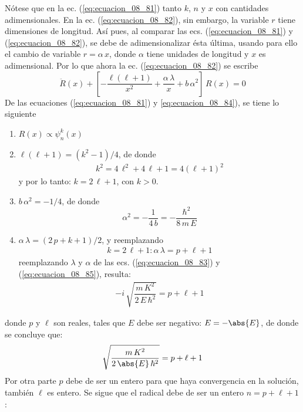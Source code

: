 Nótese que en la ec. (\ref{eq:ecuacion_08_81}) tanto $k$, $n$ y $x$ con cantidades adimensionales. En la ec. (\ref{eq:ecuacion_08_82}), sin embargo, la variable $r$ tiene dimensiones de longitud. Así pues, al comparar las ecs. (\ref{eq:ecuacion_08_81}) y (\ref{eq:ecuacion_08_82}), se debe de adimensionalizar ésta última, usando para ello el cambio de variable $r = \alpha \, x$, donde $\alpha$ tiene unidades de longitud y $x$ es adimensional. Por lo que ahora la ec. (\ref{eq:ecuacion_08_82}) se escribe
\begin{equation}
\ddot{R} (x) + \left[ - \dfrac{\ell (\ell + 1)}{x^{2}} + \dfrac{\alpha \, \lambda}{x} + b \, \alpha^{2} \right] \, R (x) = 0
\label{eq:ecuacion_08_84}
\end{equation}
De las ecuaciones (\ref{eq:ecuacion_08_81}) y \ref{eq:ecuacion_08_84}), se tiene lo siguiente
\begin{enumerate}[label=\roman*.)]
\item $R(x) \propto \psi_{n}^{k} (x)$
\item $\ell (\ell + 1) = (k^{2} - 1)/4$, de donde
\begin{align*}
k^{2} = 4 \, \ell^{2} + 4 \, \ell + 1 = 4 (\ell + 1)^{2}
\end{align*}
y por lo tanto: $k = 2 \, \ell + 1$, con $k > 0$.
\item $b \,\alpha^{2} = - 1/4$, de donde
\begin{equation}
\alpha^{2} =  - \dfrac{1}{4 \, b} = - \dfrac{\hbar^{2}}{8 \, m \, E}
\label{eq:ecuacion_08_85}
\end{equation}
\item $\alpha \, \lambda = (2 \, p + k + 1)/2$, y reemplazando
\begin{align*}
k =  2 \, \ell + 1 : \alpha \, \lambda = p + \ell + 1
\end{align*}
reemplazando $\lambda$ y $\alpha$ de las ecs. (\ref{eq:ecuacion_08_83}) y (\ref{eq:ecuacion_08_85}), resulta:
\begin{align*}
- i \, \sqrt{\dfrac{m \, K^{2}}{2 \, E \, \hbar^{2}}} = p + \ell + 1
\end{align*}
\end{enumerate}
donde $p$ y $\ell$ son reales, tales que $E$ debe ser negativo: $E = - \abs{E}$, de donde se concluye que:
\begin{align*}
\sqrt{\dfrac{m \, K^{2}}{2 \, \abs{E} \, \hbar^{2}}} = p + \ell + 1
\end{align*}
Por otra parte $p$ debe de ser un entero para que haya convergencia en la solución, también $\ell$ es entero. Se sigue que el radical debe de ser un entero $n = p + \ell + 1$:
